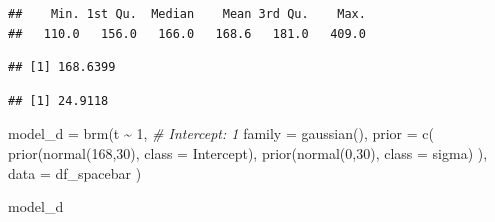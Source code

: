 \documentclass[
]{article}
\newenvironment{Shaded}{\begin{snugshade}}{\end{snugshade}}
\newcommand{\AttributeTok}[1]{\textcolor[rgb]{0.77,0.63,0.00}{#1}}
\newcommand{\CommentTok}[1]{\textcolor[rgb]{0.56,0.35,0.01}{\textit{#1}}}
\newcommand{\DecValTok}[1]{\textcolor[rgb]{0.00,0.00,0.81}{#1}}
\newcommand{\FunctionTok}[1]{\textcolor[rgb]{0.00,0.00,0.00}{#1}}
\newcommand{\NormalTok}[1]{#1}
\newcommand{\OtherTok}[1]{\textcolor[rgb]{0.56,0.35,0.01}{#1}}
\newcommand{\SpecialCharTok}[1]{\textcolor[rgb]{0.00,0.00,0.00}{#1}}
\begin{document}
\begin{Shaded}
\end{Shaded}

\begin{verbatim}
##    Min. 1st Qu.  Median    Mean 3rd Qu.    Max. 
##   110.0   156.0   166.0   168.6   181.0   409.0
\end{verbatim}

\begin{Shaded}
\end{Shaded}

\begin{verbatim}
## [1] 168.6399
\end{verbatim}

\begin{verbatim}
## [1] 24.9118
\end{verbatim}

\begin{Shaded}
\begin{Highlighting}[]
\NormalTok{model\_d }\OtherTok{=} \FunctionTok{brm}\NormalTok{(t }\SpecialCharTok{\textasciitilde{}} \DecValTok{1}\NormalTok{,    }\CommentTok{\# Intercept: 1}
              \AttributeTok{family =} \FunctionTok{gaussian}\NormalTok{(),}
              \AttributeTok{prior =}
                  \FunctionTok{c}\NormalTok{(}
                    \FunctionTok{prior}\NormalTok{(}\FunctionTok{normal}\NormalTok{(}\DecValTok{168}\NormalTok{,}\DecValTok{30}\NormalTok{), }\AttributeTok{class =}\NormalTok{ Intercept),}
                    \FunctionTok{prior}\NormalTok{(}\FunctionTok{normal}\NormalTok{(}\DecValTok{0}\NormalTok{,}\DecValTok{30}\NormalTok{), }\AttributeTok{class =}\NormalTok{ sigma)}
\NormalTok{                  ),}
                \AttributeTok{data =}\NormalTok{ df\_spacebar}
\NormalTok{              )}
\end{Highlighting}
\end{Shaded}

\begin{Shaded}
\begin{Highlighting}[]
\NormalTok{model\_d}
\end{Highlighting}
\end{Shaded}
\end{document}
